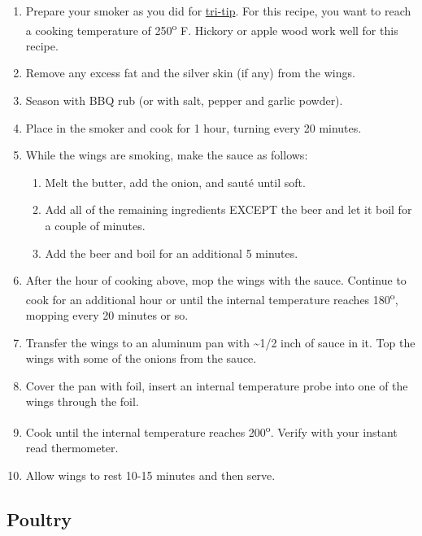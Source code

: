 \documentclass[
]{book}
\providecommand{\tightlist}{%
  \setlength{\itemsep}{0pt}\setlength{\parskip}{0pt}}
\begin{document}
\begin{enumerate}
\def\labelenumi{\arabic{enumi}.}
\tightlist
\item
  Prepare your smoker as you did for \protect\hyperlink{tritip}{tri-tip}. For this recipe, you want to reach a cooking temperature of 250\textsuperscript{o} F. Hickory or apple wood work well for this recipe.\\
\item
  Remove any excess fat and the silver skin (if any) from the wings.
\item
  Season with BBQ rub (or with salt, pepper and garlic powder).
\item
  Place in the smoker and cook for 1 hour, turning every 20 minutes.
\item
  While the wings are smoking, make the sauce as follows:

  \begin{enumerate}
  \def\labelenumii{\alph{enumii}.}
  \tightlist
  \item
    Melt the butter, add the onion, and sauté until soft.\\
  \item
    Add all of the remaining ingredients EXCEPT the beer and let it boil for a couple of minutes.\\
  \item
    Add the beer and boil for an additional 5 minutes.
  \end{enumerate}
\item
  After the hour of cooking above, mop the wings with the sauce. Continue to cook for an additional hour or until the internal temperature reaches 180\textsuperscript{o}, mopping every 20 minutes or so.
\item
  Transfer the wings to an aluminum pan with \textasciitilde1/2 inch of sauce in it. Top the wings with some of the onions from the sauce.
\item
  Cover the pan with foil, insert an internal temperature probe into one of the wings through the foil.
\item
  Cook until the internal temperature reaches 200\textsuperscript{o}. Verify with your instant read thermometer.
\item
  Allow wings to rest 10-15 minutes and then serve.
\end{enumerate}

\hypertarget{poultry}{%
\subsection{Poultry}\label{poultry}}
\end{document}
